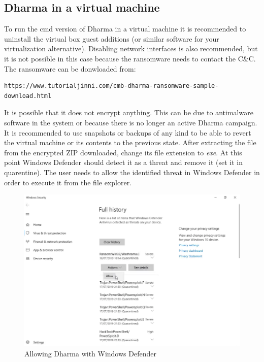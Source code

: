 \subsection*{Dharma in a virtual machine}
To run the cmd version of Dharma in a virtual machine it is recommended to uninstall the virtual box guest additions (or similar software for your virtualization alternative).
Disabling network interfaces is also recommended, but it is not possible in this case because the ransomware needs to contact the C\&C.
The ransomware can be donwloaded from:
\begin{lstlisting}[style=txt,numbers=none]
https://www.tutorialjinni.com/cmb-dharma-ransomware-sample-download.html
\end{lstlisting}
\linej
It is possible that it does not encrypt anything. This can be due to antimalware software in the system or because there is no longer an active Dharma campaign.
It is recommended to use snapshots or backups of any kind to be able to revert the virtual machine or its contents to the previous state.
\linej
\linej
After extracting the file from the encrypted ZIP downloaded, change its file extension to \textit{exe}. At this point Windows Defender should detect it as a threat and remove it (set it in quarentine). The user needs to allow the identified threat in Windows Defender in order to execute it from the file explorer.
\begin{figure}[H]
  \centering
	\includegraphics[width=\textwidth]{figuras/allowing_dharma_with_wd.png}
	\caption{Allowing Dharma with Windows Defender}
\end{figure}

